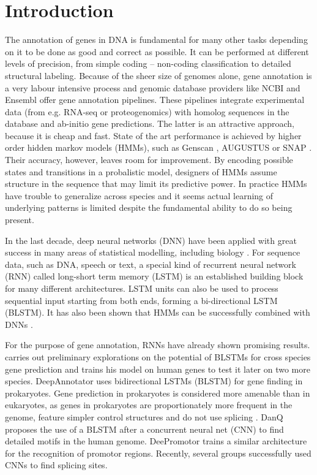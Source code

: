 \documentclass{bioinfo}
\begin{document}
\section{Introduction}
The annotation of genes in DNA is fundamental for many other tasks depending on it to be done as good and correct as possible. It can be performed at different levels of precision, from simple coding -- non-coding classification to detailed structural labeling. Because of the sheer size of genomes alone, gene annotation is a very labour intensive process and genomic database providers like NCBI \citep{thibaud2013eukaryotic} and Ensembl \citep{aken2016ensembl} offer gene annotation pipelines. These pipelines integrate experimental data (from e.g. RNA-seq or proteogenomics) with homolog sequences in the database and ab-initio gene predictions. The latter is an attractive approach, because it is cheap and fast. State of the art performance is achieved by higher order hidden markov models (HMMs), such as Genscan \citep{burge1997prediction}, AUGUSTUS \citep{stanke2003gene} or SNAP \citep{johnson2008snap}. Their accuracy, however, leaves room for improvement. By encoding possible states and transitions in a probalistic model, designers of HMMs assume structure in the sequence that may limit its predictive power. In practice HMMs have trouble to generalize across species and it seems actual learning of underlying patterns is limited despite the fundamental ability to do so being present. 

In the last decade, deep neural networks (DNN) have been applied with great success in many areas of statistical modelling, including biology \citep{ching2018opportunities}. For sequence data, such as DNA, speech or text, a special kind of recurrent neural network (RNN) called long-short term memory (LSTM) \citep{hochreiter1997long} is an established building block for many different architectures. LSTM units can also be used to process sequential input starting from both ends, forming a bi-directional LSTM (BLSTM). It has also been shown that HMMs can be successfully combined with DNNs \citep{liu2016novo, liu2016pedla}.

For the purpose of gene annotation, RNNs have already shown promising results. \citep{choudharypredicting} carries out preliminary explorations on the potential of BLSTMs for cross species gene prediction and trains his model on human genes to test it later on two more species. DeepAnnotator \citep{amin2018deepannotator} uses bidirectional LSTMs (BLSTM) for gene finding in prokaryotes. Gene prediction in prokaryotes is considered more amenable than in eukaryotes, as genes in prokaryotes are proportionately more frequent in the genome, feature simpler control structures and do not use splicing \citep{wang2004brief}. DanQ \citep{quang2016danq} proposes the use of a BLSTM after a concurrent neural net (CNN) to find detailed motifs in the human genome. DeePromotor \citep{oubounyt2019deepromoter} trains a similar architecture for the recognition of promotor regions. Recently, several groups \citep{jaganathan2019predicting, wang2019splicefinder} successfully used CNNs to find splicing sites.
\end{document}
